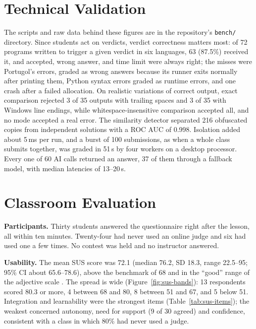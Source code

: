 \documentclass[12pt]{article}
\begin{document}
\section{Technical Validation}\label{sec:validation}\label{sec:performance}\label{sec:perf-verdicts}\label{sec:perf-similarity}

The scripts and raw data behind these figures are in the repository's \texttt{bench/} directory. Since students act on verdicts, verdict correctness matters most: of 72 programs written to trigger a given verdict in six languages, 63 (87.5\%) received it, and accepted, wrong answer, and time limit were always right; the misses were Portugol's errors, graded as wrong answers because its runner exits normally after printing them, Python syntax errors graded as runtime errors, and one crash after a failed allocation. On realistic variations of correct output, exact comparison rejected 3 of 35 outputs with trailing spaces and 3 of 35 with Windows line endings, while whitespace-insensitive comparison accepted all, and no mode accepted a real error. The similarity detector separated 216 obfuscated copies from independent solutions with a ROC AUC of 0.998. Isolation added about 5\,ms per run, and a burst of 100 submissions, as when a whole class submits together, was graded in 51\,s by four workers on a desktop processor. Every one of 60 AI calls returned an answer, 37 of them through a fallback model, with median latencies of 13--20\,s.

\section{Classroom Evaluation}\label{sec:evaluation-status}

\textbf{Participants.} Thirty students answered the questionnaire right after the lesson, all within ten minutes. Twenty-four had never used an online judge and six had used one a few times. No contest was held and no instructor answered.

\textbf{Usability.} The mean SUS score was 72.1 (median 76.2, SD 18.3, range 22.5--95; 95\% CI about 65.6--78.6), above the benchmark of 68 \cite{sauro2011sus} and in the ``good'' range of the adjective scale \cite{bangor2009sus}. The spread is wide (Figure~\ref{fig:sus-bands}): 13 respondents scored 80.3 or more, 4 between 68 and 80, 8 between 51 and 67, and 5 below 51. Integration and learnability were the strongest items (Table~\ref{tab:sus-items}); the weakest concerned autonomy, need for support (9 of 30 agreed) and confidence, consistent with a class in which 80\% had never used a judge.
\end{document}
